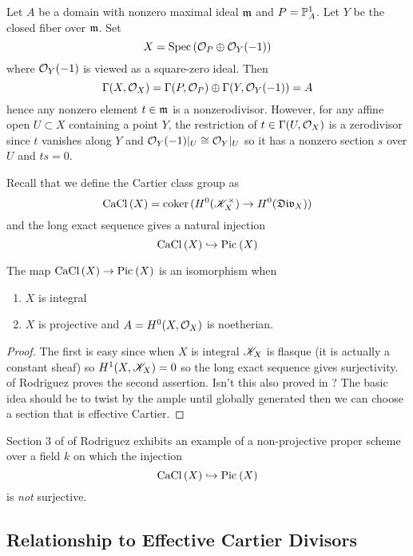 \documentclass[12pt]{article}
\begin{document}
\begin{example}
Let $A$ be a domain with nonzero maximal ideal $\m$ and $P = \P^1_A$. Let $Y$ be the closed fiber over $\m$. Set
\[ X = \Spec{\struct{P} \oplus \struct{Y}(-1)} \]
where $\struct{Y}(-1)$ is viewed as a square-zero ideal. Then
\[ \Gamma(X, \struct{X}) = \Gamma(P, \struct{P}) \oplus \Gamma(Y, \struct{Y}(-1)) = A \]
hence any nonzero element $t \in \m$ is a nonzerodivisor. However, for any affine open $U \subset X$ containing a point $Y$, the restriction of $t \in \Gamma(U, \struct{X})$ is a zerodivisor since $t$ vanishes along $Y$ and $\struct{Y}(-1)|_U \cong \struct{Y}|_U$ so it has a nonzero section $s$ over $U$ and $ts = 0$.
\end{example}

Recall that we define the Cartier class group as
\[ \CaCl{X} = \coker{(H^0(\K_X^\times) \to H^0(\Div_X))} \]
and the long exact sequence gives a natural injection
\[ \CaCl{X} \embed \Pic{X} \]

\begin{theorem}
The map $\CaCl{X} \to \Pic{X}$ is an isomorphism when
\begin{enumerate}
\item $X$ is integral
\item $X$ is projective and $A = H^0(X,\struct{X})$ is noetherian.
\end{enumerate}
\end{theorem}

\begin{proof}
The first is easy since when $X$ is integral $\K_X$ is flasque (it is actually a constant sheaf) so $H^1(X, \K_X) = 0$ so the long exact sequence gives surjectivity.  of Rodriguez proves the second assertion. Isn't this also proved in ? The basic idea should be to twist by the ample until globally generated then we can choose a section that is effective Cartier. 
\end{proof}

Section $3$ of  of Rodriguez exhibits an example of a non-projective proper scheme over a field $k$ on which the injection
\[ \CaCl{X} \embed \Pic{X} \]
is \textit{not} surjective. 

\subsection{Relationship to Effective Cartier Divisors}
\end{document}
